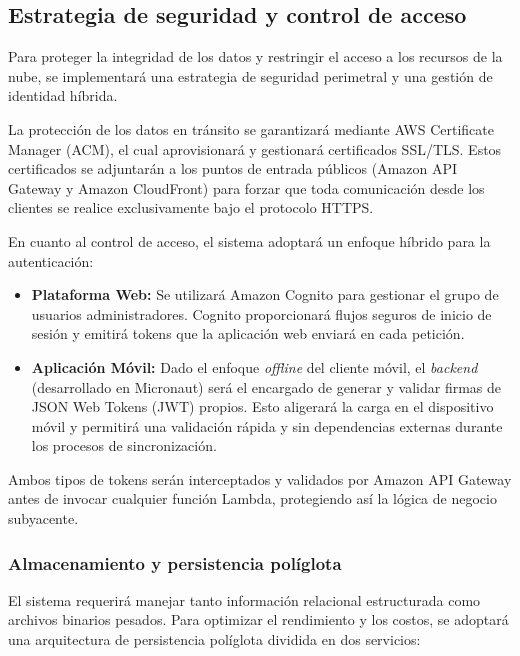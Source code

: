 \newpage
\subsection{Estrategia de seguridad y control de acceso}
\label{sec:seguridad-nube}

Para proteger la integridad de los datos y restringir el acceso a los recursos de la nube, se implementará una estrategia de seguridad perimetral y una gestión de identidad híbrida. 

La protección de los datos en tránsito se garantizará mediante AWS Certificate Manager (ACM), el cual aprovisionará y gestionará certificados SSL/TLS. Estos certificados se adjuntarán a los puntos de entrada públicos (Amazon API Gateway y Amazon CloudFront) para forzar que toda comunicación desde los clientes se realice exclusivamente bajo el protocolo HTTPS.

En cuanto al control de acceso, el sistema adoptará un enfoque híbrido para la autenticación:
\begin{itemize}
    \item \textbf{Plataforma Web:} Se utilizará Amazon Cognito para gestionar el grupo de usuarios administradores. Cognito proporcionará flujos seguros de inicio de sesión y emitirá tokens que la aplicación web enviará en cada petición.
    \item \textbf{Aplicación Móvil:} Dado el enfoque \textit{offline} del cliente móvil, el \textit{backend} (desarrollado en Micronaut) será el encargado de generar y validar firmas de JSON Web Tokens (JWT) propios. Esto aligerará la carga en el dispositivo móvil y permitirá una validación rápida y sin dependencias externas durante los procesos de sincronización.
\end{itemize}
Ambos tipos de tokens serán interceptados y validados por Amazon API Gateway antes de invocar cualquier función Lambda, protegiendo así la lógica de negocio subyacente.

\subsubsection{Almacenamiento y persistencia políglota}

El sistema requerirá manejar tanto información relacional estructurada como archivos binarios pesados. Para optimizar el rendimiento y los costos, se adoptará una arquitectura de persistencia políglota dividida en dos servicios:

